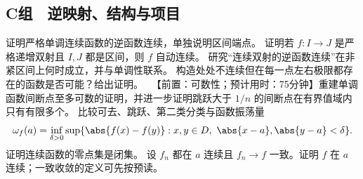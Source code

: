 \subsection*{C组　逆映射、结构与项目}
\begin{enumerate}[label=\textbf{17.\arabic*.},resume]
  \mustdo 证明严格单调连续函数的逆函数连续，单独说明区间端点。
  \mustdo 证明若 \(f:I\to J\) 是严格递增双射且 \(I,J\) 都是区间，则 \(f\) 自动连续。
  \optionaldo 研究“连续双射的逆函数连续”在非紧区间上何时成立，并与单调性联系。
  \optionaldo 构造处处不连续但在每一点左右极限都存在的函数是否可能？给出证明。
  \projectdo\ 【前置：可数性；预计用时：75分钟】重建单调函数间断点至多可数的证明，并进一步证明跳跃大于 \(1/n\) 的间断点在有界值域内只有有限多个。
  \opendo 比较可去、跳跃、第二类分类与函数振荡量
 \[
 \omega_f(a)=\inf_{\delta>0}\sup\{\abs{f(x)-f(y)}:x,y\in D,\ \abs{x-a},\abs{y-a}<\delta\}.
 \]
  \mustdo 证明连续函数的零点集是闭集。
  \optionaldo 设 \(f_n\) 都在 \(a\) 连续且 \(f_n\to f\) 一致。证明 \(f\) 在 \(a\) 连续；一致收敛的定义可先按预读。
\end{enumerate}
